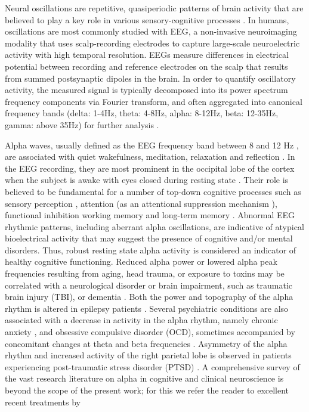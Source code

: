 \documentclass[12pt,twoside]{article}
\begin{document}
Neural oscillations are repetitive, quasiperiodic patterns of brain activity that are believed to play a key role in various sensory-cognitive processes \citep{pmid24174901}. In humans, oscillations are most commonly studied with EEG, a non-invasive neuroimaging modality that uses scalp-recording electrodes to capture large-scale neuroelectric activity with high temporal resolution. EEGs measure differences in electrical potential between recording and reference electrodes on the scalp that results from summed postsynaptic dipoles in the brain. In order to quantify oscillatory activity, the measured signal is typically decomposed into its power spectrum frequency components via Fourier transform, and often aggregated into canonical frequency bands (delta: 1-4Hz, theta: 4-8Hz, alpha: 8-12Hz, beta: 12-35Hz, gamma: above 35Hz) for further analysis \citep{ABHANG201619}.

Alpha waves, usually defined as the EEG frequency band between 8 and 12 Hz \citep{MOINI2020177}, are associated with quiet wakefulness, meditation, relaxation and reflection \citep{halgren2019generation}. In the EEG recording, they are most prominent in the occipital lobe of the cortex when the subject is awake with eyes closed  during resting state \citep{klimesch1999eeg}. Their role is believed to be fundamental for a number of top-down cognitive processes \citep{halgren2019generation} such as sensory perception \citep{samaha2015speed}, attention (as an attentional suppression mechanism \citealt{foxe2011role}), functional inhibition \citep{jensen2010shaping} working memory \citep{wianda2019roles} and long-term memory  \citep{klimesch2012alpha}.
Abnormal EEG rhythmic patterns, including aberrant alpha oscillations, are indicative of atypical bioelectrical activity that may suggest the presence of cognitive and/or mental disorders. Thus, robust resting state alpha activity is considered an indicator of healthy cognitive functioning. Reduced alpha power or lowered alpha peak frequencies resulting from aging, head trauma, or exposure to toxins may be correlated with a neurological disorder or brain impairment, such as traumatic brain injury (TBI), or dementia \citep{scally2018resting, buchanan2021elevated}. Both the power and topography of the alpha rhythm is altered in epilepsy patients \citep{abela2019slower}. Several psychiatric conditions are also associated with a decrease in activity in the alpha rhythm, namely chronic anxiety \citep{fingelkurts2006composition, roohi2017changes}, and obsessive compulsive disorder (OCD), sometimes accompanied by concomitant changes at theta and beta frequencies \citep{karadag2003quantitative}. Asymmetry of the alpha rhythm and increased activity of the right parietal lobe is observed in patients experiencing post-traumatic stress disorder (PTSD) \citep{metzger2004ptsd,roohi2017changes}. 
A comprehensive survey of the vast research literature on alpha in cognitive and clinical neuroscience is beyond the scope of the present work; for this we refer the reader to excellent recent treatments by \citet{ippolito2022role, bacsar2012short}
\end{document}
